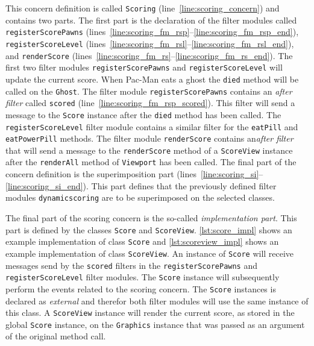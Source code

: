 This concern definition is called \lstinline|Scoring| (line~\ref{line:scoring_concern}) and contains two parts.
The first part is the declaration of the filter modules called \lstinline|registerScorePawns| (lines~\ref{line:scoring_fm_rsp}--\ref{line:scoring_fm_rsp_end}), \lstinline|registerScoreLevel| (lines~\ref{line:scoring_fm_rsl}--\ref{line:scoring_fm_rsl_end}), and \lstinline|renderScore| (lines~\ref{line:scoring_fm_rs}--\ref{line:scoring_fm_rs_end}).
The first two filter modules \lstinline|registerScorePawns| and \lstinline|registerScoreLevel| will update the current score. When Pac-Man eats a ghost the \lstinline|died| method will be called on the \lstinline|Ghost|. The filter module \lstinline|registerScorePawns| contains an \emph{after filter} called \lstinline|scored| (line~\ref{line:scoring_fm_rsp_scored}). This filter will send a message to the \lstinline|Score| instance after the \lstinline|died| method has been called. The \lstinline|registerScoreLevel| filter module contains a similar filter for the \lstinline|eatPill| and \lstinline|eatPowerPill| methods.
The filter module \lstinline|renderScore| contains an\emph{after filter} that will send a message to the \lstinline|renderScore| method of a \lstinline|ScoreView| instance after the \lstinline|renderAll| method of \lstinline|Viewport| has been called.
The final part of the concern definition is the superimposition part (lines~\ref{line:scoring_si}--\ref{line:scoring_si_end}).
This part defines that the previously defined filter modules \lstinline|dynamicscoring| are to be superimposed on the selected classes.

The final part of the scoring concern is the so-called \emph{implementation part}.
This part is defined by the classes \lstinline|Score| and \lstinline|ScoreView|.
\autoref{lst:score_impl} shows an example implementation of class \lstinline|Score| and \autoref{lst:scoreview_impl} shows an example implementation of class \lstinline|ScoreView|.
An instance of \lstinline|Score| will receive messages send by the \lstinline|scored| filters in the \lstinline|registerScorePawns| and \lstinline|registerScoreLevel| filter modules. The \lstinline|Score| instance will subsequently perform the events related to the scoring concern. The \lstinline|Score| instances is declared as \emph{external} and therefor both filter modules will use the same instance of this class.
A \lstinline|ScoreView| instance will render the current score, as stored in the global \lstinline|Score| instance, on the \lstinline|Graphics| instance that was passed as an argument of the original method call.

